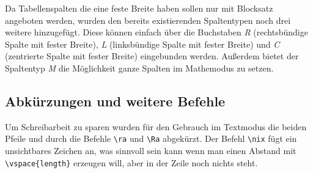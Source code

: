 \documentclass{myReport}
\begin{document}
Da Tabellenspalten die eine feste Breite haben sollen nur mit Blocksatz angeboten werden, wurden den bereits existierenden Spaltentypen noch drei weitere hinzugefügt. Diese können einfach über die Buchstaben \emph{R} (rechtsbündige Spalte mit fester Breite), \emph{L} (linksbündige Spalte mit fester Breite) und \emph{C} (zentrierte Spalte mit fester Breite) eingebunden werden. Außerdem bietet der Spaltentyp \emph{M} die Möglichkeit ganze Spalten im Mathemodus zu setzen.

\subsection{Abkürzungen und weitere Befehle}

Um Schreibarbeit zu sparen wurden für den Gebrauch im Textmodus die beiden Pfeile \ra und \Ra durch die Befehle \lstinline|\ra| und \lstinline|\Ra| abgekürzt. Der Befehl \lstinline|\nix| fügt ein unsichtbares Zeichen an, was sinnvoll sein kann wenn man einen Abstand mit \lstinline|\vspace{length}| erzeugen will, aber in der Zeile noch nichts steht.
\end{document}
